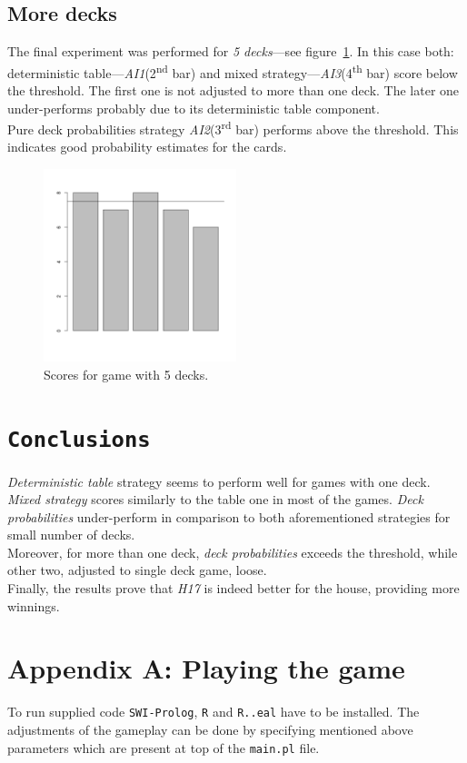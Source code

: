 \documentclass[12pt,a4paper,twocolumn]{article}
\newcommand{\ts}{\textsuperscript}
\begin{document}
\subsection*{More decks}
The final experiment was performed for \emph{5 decks}---see figure~\ref{fig:5dec}. In this case both: deterministic table---\emph{AI1}(2\ts{nd} bar) and mixed strategy---\emph{AI3}(4\ts{th} bar) score below the threshold. The first one is not adjusted to more than one deck. The later one under-performs probably due to its deterministic table component.\\
Pure deck probabilities strategy \emph{AI2}(3\ts{rd} bar) performs above the threshold. This indicates good probability estimates for the cards.

\begin{figure}[htbp]
\centering
\includegraphics[width=0.5\textwidth]{5decks}
\caption{Scores for game with 5 decks.\label{fig:5dec}}
\end{figure}


\section*{\texttt{Conclusions}}
\emph{Deterministic table} strategy seems to perform well for games with one deck. \emph{Mixed strategy} scores similarly to the table one in most of the games. \emph{Deck probabilities} under-perform in comparison to both aforementioned strategies for small number of decks.\\
Moreover, for more than one deck, \emph{deck probabilities} exceeds the threshold, while other two, adjusted to single deck game, loose.\\
Finally, the results prove that \emph{H17} is indeed better for the house, providing more winnings.


\cleardoublepage
\newpage
\section*{Appendix A: Playing the game}
To run supplied code \texttt{SWI-Prolog}, \texttt{R} and \texttt{R..eal} have to be installed. The adjustments of the gameplay can be done by specifying mentioned above parameters which are present at top of the \texttt{main.pl} file.\\
\end{document}
